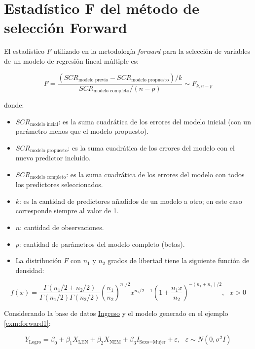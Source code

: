 \documentclass[
  11pt,
]{book}
\providecommand{\tightlist}{%
  \setlength{\itemsep}{0pt}\setlength{\parskip}{0pt}}
\theoremstyle{definition}
\theoremstyle{definition}
\theoremstyle{definition}
\theoremstyle{definition}
\theoremstyle{remark}
\begin{document}
\section{Estadístico F del método de selección Forward}\label{F-forward}

El estadístico \(F\) utilizado en la metodología \emph{forward} para la selección de variables de un modelo de regresión lineal múltiple es:

\begin{equation}
F = \displaystyle\frac{(SCR_{\text{modelo previo}} - SCR_{\text{modelo propuesto}})/k}{SCR_{\text{modelo completo}}/(n-p)} \sim F_{k, n-p}
\label{eq:EstadisticoFforward}
\end{equation}

donde:

\begin{itemize}
\tightlist
\item
  \(SCR_{\text{modelo incial}}\): es la suma cuadrática de los errores del modelo inicial (con un parámetro menos que el modelo propuesto).
\item
  \(SCR_{\text{modelo propuesto}}\): es la suma cuadrática de los errores del modelo con el nuevo predictor incluido.
\item
  \(SCR_{\text{modelo completo}}\): es la suma cuadrática de los errores del modelo con todos los predictores seleccionados.
\item
  \(k\): es la cantidad de predictores añadidos de un modelo a otro; en este caso corresponde siempre al valor de 1.
\item
  \(n\): cantidad de observaciones.
\item
  \(p\): cantidad de parámetros del modelo completo (betas).
\item
  La distribución \(F\) con \(n_1\) y \(n_2\) grados de libertad tiene la siguiente función de densidad:
\end{itemize}

\begin{equation}
f(x) = \frac{\Gamma(n_1/2+n_2/2)}{\Gamma(n_1/2)\Gamma(n_2/2)}\left(\frac{n_1}{n_2}\right)^{n_1/2}x^{n_1/2-1}\left(1+\frac{n_1x}{n_2}\right)^{-(n_1 + n_2)/2}, \text{ }x>0
\label{eq:distribucionF}
\end{equation}

Considerando la base de datos \hyperref[Ingreso]{Ingreso} y el modelo generado en el ejemplo \ref{exm:forward1}:

\[
Y_{\text{Logro}} = \beta_0 + \beta_1X_{\text{LEN}} + \beta_2X_{\text{NEM}} + \beta_3I_{\text{Sexo=Mujer}} + \varepsilon, \text{ } \varepsilon \sim N(0,\sigma^2I)
\]
\end{document}
